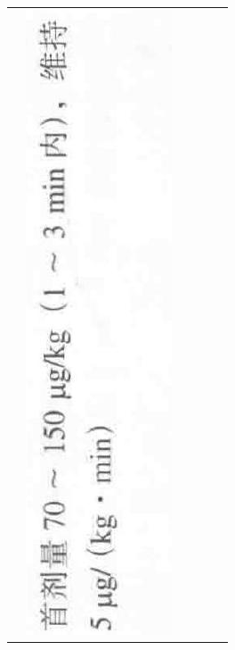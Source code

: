 \documentclass[10pt]{article}
\begin{document}
\begin{center}
\begin{tabular}{|c|c|c|c|c|c|}
 & \includegraphics[max width=\textwidth]{2024_07_05_645bb794a4d4f32ee0c8g-352(4)}

\end{tabular}
\end{center}
\end{document}
